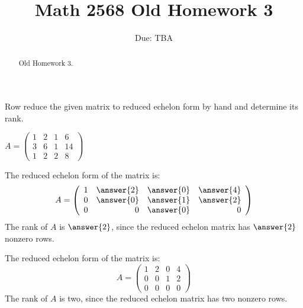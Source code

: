 \documentclass{ximera}
\title{Math 2568 Old Homework 3}
\author{\phantom{Dr. Golubitsky}}
\date{Due: TBA}
\begin{document}
\begin{abstract}
Old Homework 3. 
\end{abstract}
\maketitle


\problemlabel

\noindent Row reduce the given  matrix to reduced echelon form by hand and determine its rank.

\begin{exercise} \label{c2.4.1}
$A=\left(\begin{array}{rrrr}
1 &  2 & 1 & 6\\
3 &  6 & 1 & 14\\
1 &  2 & 2 & 8
         \end{array}\right)$
       \begin{prompt}
       The reduced echelon form of the matrix is:
\[
A = \left(\begin{array}{rrrr} 1 & \answer{2} & \answer{0} & \answer{4} \\ 0 & \answer{0} & \answer{1} & \answer{2} \\ 0 & 0 & \answer{0}
& 0\end{array}\right)
\]
The rank of $A$ is $\answer{2}$, since the reduced echelon matrix has $\answer{2}$ nonzero
rows.         
       \end{prompt}

\begin{solution}

The reduced echelon form of the matrix is:
\[
A = \left(\begin{array}{rrrr} 1 & 2 & 0 & 4 \\ 0 & 0 & 1 & 2 \\ 0 & 0 & 0
& 0\end{array}\right)
\]
The rank of $A$ is two, since the reduced echelon matrix has two nonzero
rows.

\end{solution}
\end{exercise}

\problemlabel
\end{document}
